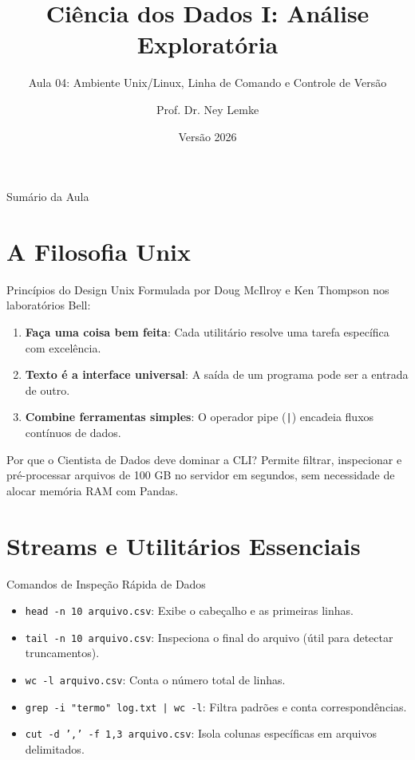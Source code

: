 \documentclass[aspectratio=169, 10pt]{beamer}
\title[Aula 04 - Linux e Git]{Ciência dos Dados I: Análise Exploratória}
\subtitle{Aula 04: Ambiente Unix/Linux, Linha de Comando e Controle de Versão}
\author{Prof. Dr. Ney Lemke}
\institute{UNESP -- Instituto de Biociências de Botucatu}
\date{Versão 2026}
\begin{document}
\frame{\titlepage}

\begin{frame}{Sumário da Aula}
  \tableofcontents
\end{frame}

\section{A Filosofia Unix}

\begin{frame}{Princípios do Design Unix}
  Formulada por Doug McIlroy e Ken Thompson nos laboratórios Bell:
  \begin{enumerate}
    \item \textbf{Faça uma coisa bem feita}: Cada utilitário resolve uma tarefa específica com excelência.
    \item \textbf{Texto é a interface universal}: A saída de um programa pode ser a entrada de outro.
    \item \textbf{Combine ferramentas simples}: O operador pipe (\texttt{|}) encadeia fluxos contínuos de dados.
  \end{enumerate}
  \begin{block}{Por que o Cientista de Dados deve dominar a CLI?}
    Permite filtrar, inspecionar e pré-processar arquivos de 100 GB no servidor em segundos, sem necessidade de alocar memória RAM com Pandas.
  \end{block}
\end{frame}

\section{Streams e Utilitários Essenciais}

\begin{frame}[fragile]{Comandos de Inspeção Rápida de Dados}
  \begin{itemize}
    \item \texttt{head -n 10 arquivo.csv}: Exibe o cabeçalho e as primeiras linhas.
    \item \texttt{tail -n 10 arquivo.csv}: Inspeciona o final do arquivo (útil para detectar truncamentos).
    \item \texttt{wc -l arquivo.csv}: Conta o número total de linhas.
    \item \texttt{grep -i "termo" log.txt | wc -l}: Filtra padrões e conta correspondências.
    \item \texttt{cut -d ',' -f 1,3 arquivo.csv}: Isola colunas específicas em arquivos delimitados.
  \end{itemize}
\end{frame}
\end{document}
